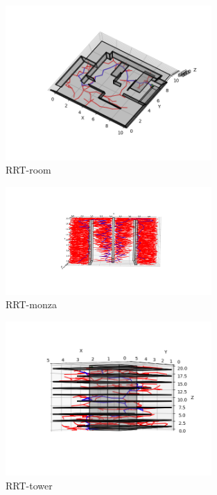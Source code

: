 \documentclass{article} %
\begin{document}
\begin{figure}[H]
	\centering
    \includegraphics[width=0.7\textwidth]{./images/RRT-room.png}
    \caption{RRT-room}
    \label{RRT-room}
\end{figure}

\begin{figure}[H]
	\centering
    \includegraphics[width=0.7\textwidth]{./images/RRT-monza.png}
    \caption{RRT-monza}
    \label{RRT-monza}
\end{figure}

\begin{figure}[H]
	\centering
    \includegraphics[width=0.7\textwidth]{./images/RRT-tower.png}
    \caption{RRT-tower}
    \label{RRT-tower}
\end{figure}
\end{document}
